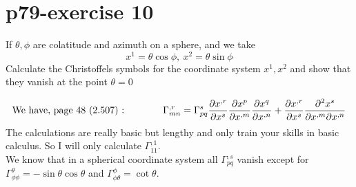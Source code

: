 \section{p79-exercise 10}
\begin{tcolorbox}
If $\theta, \phi$ are colatitude and azimuth on a sphere, and we take
$$x^1 = \theta \cos \phi, \ x^2=\theta\sin \phi$$
Calculate the Christoffels symbols for the coordinate system $x^1, x^2$ and show that they vanish at the point $\theta = 0$
\end{tcolorbox}
\begin{align}
\text{We have, page 48  (2.507) :}\quad\quad\quad\quad\Gamma_{mn}^{,r} =\Gamma_{pq}^{s}\pdv{x^{,r}}{x^s}\pdv{x^{p}}{x^{,m}}\pdv{x^{q}}{x^{,n}}+\pdv{x^{,r}}{x^s}\pdv{x^s}{x^{,m}}{x^{,n}}
\end{align}
The calculations are really basic but lengthy and only train your skills in basic calculus. So I will only calculate $\Gamma_{11}^{,1}$.\\
We know that in a spherical coordinate system all $\Gamma_{pq}^{,s}$ vanish except for $\Gamma_{\phi\phi}^{\theta} = -\sin\theta\cos\theta$ and $
\Gamma_{\phi\theta}^{\phi} =  \cot\theta$.
